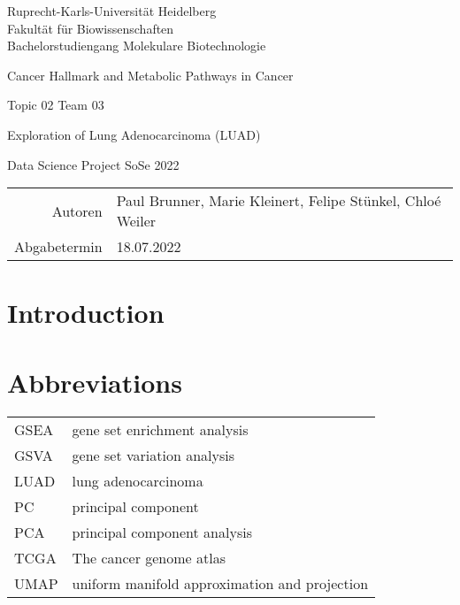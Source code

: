 \documentclass[
  parskip,
  oneside]{scrreprt}
\author{}
\date{\vspace{-2.5em}}
\begin{document}
\begin{titlepage}
\centering
    {\Large Ruprecht-Karls-Universität Heidelberg\\
        Fakultät für Biowissenschaften\\
        Bachelorstudiengang Molekulare Biotechnologie\\}

    {}
    {

        {\Huge Cancer Hallmark and Metabolic Pathways in Cancer}

      {\Huge Topic 02 Team 03}

        {\Huge Exploration of Lung Adenocarcinoma (LUAD)}

    }

    {\Large Data Science Project SoSe 2022}


    {\Large
        \begin{tabular}{rl}
            Autoren & Paul Brunner, Marie Kleinert, Felipe Stünkel, Chloé Weiler\\
            Abgabetermin &18.07.2022\\
        \end{tabular}
    }


\end{titlepage}

\hypertarget{introduction}{%
\chapter{Introduction}\label{introduction}}

\hypertarget{abbreviations}{%
\chapter{Abbreviations}\label{abbreviations}}

\begin{longtable}[]{@{}ll@{}}
\toprule
\endhead
GSEA & gene set enrichment analysis \\
GSVA & gene set variation analysis \\
LUAD & lung adenocarcinoma \\
PC & principal component \\
PCA & principal component analysis \\
TCGA & The cancer genome atlas \\
UMAP & uniform manifold approximation and projection \\
\bottomrule
\end{longtable}
\end{document}
